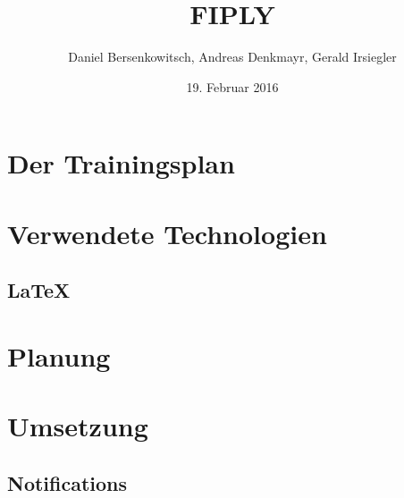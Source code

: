 \documentclass[a4paper, 12pt]{article}
\title{FIPLY}
\author{Daniel Bersenkowitsch, Andreas Denkmayr, Gerald Irsiegler}
\date{19. Februar 2016}
\begin{document}
\maketitle
\tableofcontents
\newpage

\newpage

\newpage

\newpage

\newpage


\newpage %


\newpage %
\section{Der Trainingsplan}


\newpage %
\section{Verwendete Technologien}

\newpage


\newpage
\subsection{LaTeX}







\newpage %
\section{Planung}

\newpage



\newpage %
\section{Umsetzung}

\newpage

\newpage

\newpage

\newpage

\newpage

\newpage

%
\newpage

\newpage

\newpage

\newpage

\newpage

\newpage
\subsection{Notifications}

\newpage

\end{document}
